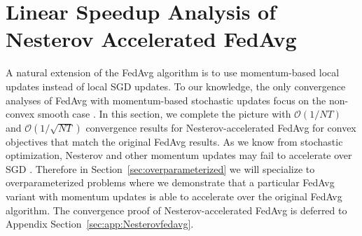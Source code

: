 


\section{Linear Speedup Analysis of Nesterov Accelerated FedAvg}
\label{sec:Nesterov}

A natural extension of the FedAvg algorithm is to use momentum-based
local updates instead of local SGD updates. To our knowledge, the
only convergence analyses of FedAvg with momentum-based stochastic
updates focus on the non-convex smooth case \cite{huo2020faster,yu2019linear,li2018federated}.
In this section, we complete the picture with $\mathcal{O}(1/NT)$
and $\mathcal{O}(1/\sqrt{NT})$ convergence results for Nesterov-accelerated
FedAvg for convex objectives that match the original FedAvg results.
As we know from stochastic optimization, Nesterov and other momentum
updates may fail to accelerate over SGD \cite{liu2018accelerating,kidambi2018insufficiency,liu2018toward,yuan2016influence}.
Therefore in Section~\ref{sec:overparameterized} we will specialize to overparameterized
problems where we demonstrate that a particular FedAvg variant with
momentum updates is able to accelerate over the original FedAvg algorithm. 
The convergence proof of Nesterov-accelerated FedAvg is deferred to Appendix Section~\ref{sec:app:Nesterovfedavg}.


